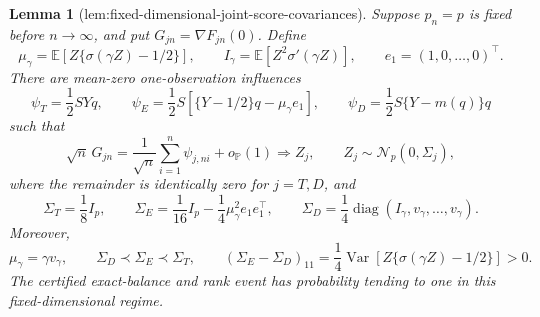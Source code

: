 \documentclass{article}
\newtheorem{lemma}{Lemma}
\begin{document}
\begin{lemma}[lem:fixed-dimensional-joint-score-covariances]\label{lem:fixed-dimensional-joint-score-covariances}
Suppose \(p_n=p\) is fixed before \(n\to\infty\), and put \(G_{jn}=\nabla F_{jn}(0)\).  Define
\[
 \mu_\gamma=\mathbb E\!\left[Z\{\sigma(\gamma Z)-1/2\}\right],
 \qquad
 I_\gamma=\mathbb E[Z^2\sigma'(\gamma Z)],
 \qquad e_1=(1,0,\ldots,0)^\top.
\]
There are mean-zero one-observation influences
\[
 \psi_T=\frac12SYq,
 \qquad
 \psi_E=\frac12S\left[\{Y-1/2\}q-\mu_\gamma e_1\right],
 \qquad
 \psi_D=\frac12S\{Y-m(q)\}q
\]
such that
\[
 \sqrt n\,G_{jn}=\frac1{\sqrt n}\sum_{i=1}^n\psi_{j,ni}+o_{\mathbb P}(1)
 \Rightarrow Z_j,
 \qquad Z_j\sim\mathcal N_p(0,\Sigma_j),
\]
where the remainder is identically zero for \(j=T,D\), and
\[
 \Sigma_T=\frac18I_p,
 \qquad
 \Sigma_E=\frac1{16}I_p-\frac14\mu_\gamma^2e_1e_1^\top,
 \qquad
 \Sigma_D=\frac14\operatorname{diag}(I_\gamma,v_\gamma,\ldots,v_\gamma).
\]
Moreover,
\[
 \mu_\gamma=\gamma v_\gamma,
 \qquad
 \Sigma_D\prec\Sigma_E\prec\Sigma_T,
 \qquad
 (\Sigma_E-\Sigma_D)_{11}
 =\frac14\operatorname{Var}\!\left[Z\{\sigma(\gamma Z)-1/2\}\right]>0.
\]
The certified exact-balance and rank event has probability tending to one in this fixed-dimensional regime.
\end{lemma}
\end{document}
